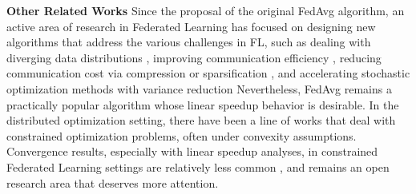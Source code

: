 \textbf{Other Related Works} Since the proposal of the original FedAvg algorithm, an active area of research in Federated Learning has focused on designing new algorithms that address the various challenges in FL, such as dealing with diverging data distributions \cite{sattler2020clustered}, improving communication efficiency \cite{sattler2019robust,chen2019communication,xu2020ternary,zhu2019multi,zhou2021communication}, reducing communication cost via compression or sparsification \cite{alistarh2017qsgd,wangni2017gradient,jiang2019improving,li2020acceleration}, and accelerating stochastic optimization methods with variance reduction \cite{horvath2019stochastic,dinh2020federated} Nevertheless, FedAvg remains a practically popular algorithm whose linear speedup behavior is desirable. In the distributed optimization setting, there have been a line of works \cite{liu2016collective,yuan2016convergence,yuan2020stochastic,yuan2018optimal} that deal with constrained optimization problems, often under convexity assumptions. Convergence results, especially with linear speedup analyses, in constrained Federated Learning settings are relatively less common \cite{wang2019adaptive}, and remains an open research area that deserves more attention. 













